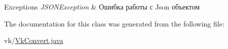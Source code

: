 \begin{DoxyExceptions}{Exceptions}
{\em J\+S\+O\+N\+Exception} & Ошибка работы с Json объектом \\
\hline
\end{DoxyExceptions}


The documentation for this class was generated from the following file\+:\begin{DoxyCompactItemize}
\item 
vk/\hyperlink{_vk_convert_8java}{Vk\+Convert.\+java}\end{DoxyCompactItemize}
